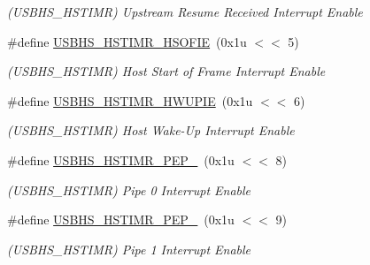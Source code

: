 \begin{DoxyCompactItemize}
\begin{DoxyCompactList}\small\item\em (U\+S\+B\+H\+S\+\_\+\+H\+S\+T\+I\+MR) Upstream Resume Received Interrupt Enable \end{DoxyCompactList}\item 
\mbox{\label{group__SAMS70__USBHS_ga4ee6df30ca79ad576ed2eb15f029608e}} 
\#define \mbox{\hyperlink{group__SAMS70__USBHS_ga4ee6df30ca79ad576ed2eb15f029608e}{U\+S\+B\+H\+S\+\_\+\+H\+S\+T\+I\+M\+R\+\_\+\+H\+S\+O\+F\+IE}}~(0x1u $<$$<$ 5)
\begin{DoxyCompactList}\small\item\em (U\+S\+B\+H\+S\+\_\+\+H\+S\+T\+I\+MR) Host Start of Frame Interrupt Enable \end{DoxyCompactList}\item 
\mbox{\label{group__SAMS70__USBHS_gaafb0e3fbc603a463affb7a12d70bef38}} 
\#define \mbox{\hyperlink{group__SAMS70__USBHS_gaafb0e3fbc603a463affb7a12d70bef38}{U\+S\+B\+H\+S\+\_\+\+H\+S\+T\+I\+M\+R\+\_\+\+H\+W\+U\+P\+IE}}~(0x1u $<$$<$ 6)
\begin{DoxyCompactList}\small\item\em (U\+S\+B\+H\+S\+\_\+\+H\+S\+T\+I\+MR) Host Wake-\/\+Up Interrupt Enable \end{DoxyCompactList}\item 
\mbox{\label{group__SAMS70__USBHS_ga60199eab9715e425a8c753fc6d59dec2}} 
\#define \mbox{\hyperlink{group__SAMS70__USBHS_ga60199eab9715e425a8c753fc6d59dec2}{U\+S\+B\+H\+S\+\_\+\+H\+S\+T\+I\+M\+R\+\_\+\+P\+E\+P\+\_}}~(0x1u $<$$<$ 8)
\begin{DoxyCompactList}\small\item\em (U\+S\+B\+H\+S\+\_\+\+H\+S\+T\+I\+MR) Pipe 0 Interrupt Enable \end{DoxyCompactList}\item 
\mbox{\label{group__SAMS70__USBHS_ga6172d112a349a26be5a03337ea3fc71d}} 
\#define \mbox{\hyperlink{group__SAMS70__USBHS_ga6172d112a349a26be5a03337ea3fc71d}{U\+S\+B\+H\+S\+\_\+\+H\+S\+T\+I\+M\+R\+\_\+\+P\+E\+P\+\_}}~(0x1u $<$$<$ 9)
\begin{DoxyCompactList}\small\item\em (U\+S\+B\+H\+S\+\_\+\+H\+S\+T\+I\+MR) Pipe 1 Interrupt Enable \end{DoxyCompactList}\item 

\end{DoxyCompactItemize}
